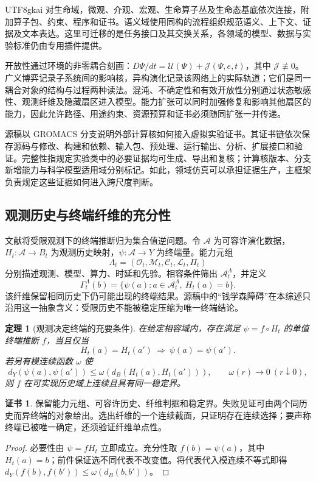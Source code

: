 \documentclass[11pt,a4paper]{article}
\theoremstyle{plain}
\newtheorem{theorem}{定理}[section]
\theoremstyle{definition}
\newtheorem*{certificate}{证书}
\theoremstyle{remark}
\begin{document}
\begin{CJK*}{UTF8}{gkai}
对生命域，微观、介观、宏观、生命算子丛及生命态基底依次连接，附加算子包、约束、程序和证书。语义域使用同构的流程组织规范语义、上下文、证据及文本表达。这里可迁移的是任务接口及其交换关系，各领域的模型、数据与实验标准仍由专用插件提供。

开放性通过环境的非零耦合刻画：$D\Psi/dt=\mathcal U(\Psi)+\mathcal J(\Psi,e,t)$，其中 $\mathcal J\not\equiv0$。广义博弈记录子系统间的影响核，异构演化记录该网络上的实际轨道；它们是同一耦合对象的结构与过程两种读法。混沌、不确定性和有效开放性分别通过状态敏感性、观测纤维及隐藏扇区进入模型。能力扩张可以同时加强修复和影响其他扇区的能力，因此允许路径、用途约束、资源预算和证书必须随同扩张一并传递。

源稿以 GROMACS 分支说明外部计算核如何接入虚拟实验证书。其证书链依次保存源码与修改、构建和依赖、输入包、预处理、运行输出、分析、扩展接口和验证。完整性指规定实验类中的必要证据均可生成、导出和复核；计算核版本、分支新增能力与科学模型适用域分别标记。如此，领域仿真可以承担证据生产，主框架负责规定这些证据如何进入跨尺度判断。

\subsection{观测历史与终端纤维的充分性}

文献\cite{S28}将受限观测下的终端推断归为集合值逆问题。令 $\mathcal A$ 为可容许演化数据，$H_t:\mathcal A\to B_t$ 为观测历史映射，$\psi:\mathcal A\to Y$ 为终端量。能力元组
\[
 \Lambda_t=(\mathcal O_t,\mathcal M_t,\mathcal C_t,\mathcal L_t,\Pi_t)
\]
分别描述观测、模型、算力、时延和先验。相容条件筛出 $\mathcal A_t^{\Lambda}$，并定义
\[
 \Gamma_t^{\Lambda}(b)
 =\{\psi(a):a\in\mathcal A_t^{\Lambda},\ H_t(a)=b\}.
\]
该纤维保留相同历史下仍可能出现的终端结果。源稿中的“钱学森障碍”在本综述只沿用这一抽象含义：受限历史不能被稳定压缩为唯一终端结论。

\begin{theorem}[观测决定终端的充要条件]
\label{ss:observability}
在给定相容域内，存在满足 $\psi=f\circ H_t$ 的单值终端推断 $f$，当且仅当
\[
 H_t(a)=H_t(a')\ \Longrightarrow\ \psi(a)=\psi(a').
\]
若另有模连续函数 $\omega$ 使
\[
 d_Y(\psi(a),\psi(a'))\le\omega(d_B(H_t(a),H_t(a'))),
 \qquad \omega(r)\to0\ (r\downarrow0),
\]
则 $f$ 在可实现历史域上连续且具有同一稳定界。
\end{theorem}
\begin{certificate}
保留能力元组、可容许历史、纤维判据和稳定界。失败见证可由两个同历史而异终端的对象给出。选出纤维的一个连续截面，只证明存在连续选择；要声称终端已被唯一确定，还须验证纤维单点性。
\end{certificate}
\begin{proof}
必要性由 $\psi=fH_t$ 立即成立。充分性取 $f(b)=\psi(a)$，其中 $H_t(a)=b$；前件保证选不同代表不改变值。将代表代入模连续不等式即得 $d_Y(f(b),f(b'))\le\omega(d_B(b,b'))$。
\end{proof}


\end{CJK*}
\end{document}
